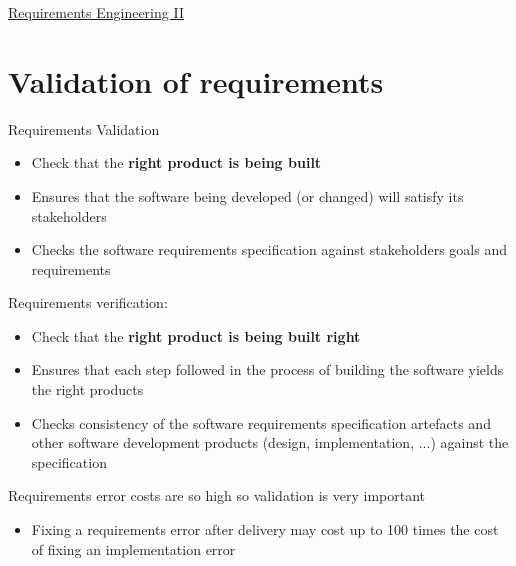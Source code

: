 \documentclass{article}[18pt]
\begin{document}
\begin{center}
\underline{\huge Requirements Engineering II}
\end{center}
\section{Validation of requirements}
\begin{minipage}{0.8\textwidth}

Requirements Validation
\begin{itemize}
	\item Check that the \textbf{right product is being built}
	\item Ensures that the software being developed (or changed) will satisfy its stakeholders
	\item Checks the software requirements specification against stakeholders goals and requirements
\end{itemize}
Requirements verification:
\begin{itemize}
	\item Check that the \textbf{right product is being built right}
	\item Ensures that each step followed in the process of building the software yields the right products
	\item Checks consistency of the software requirements specification artefacts and other software development products (design, implementation, ...) against the specification
\end{itemize}
Requirements error costs are so high so validation is very important
\begin{itemize}
	\item Fixing a requirements error after delivery may cost up to 100 times the cost of fixing an implementation error
\end{itemize}

\end{minipage}
\end{document}
